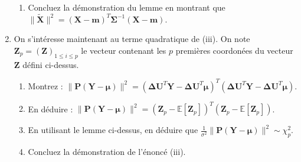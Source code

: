 \documentclass{../headers/td_upc}
\providecommand{\1}{\mathds{1}}
\begin{document}
\begin{enumerate}
\begin{enumerate}
		\item Concluez la démonstration du lemme en montrant que 
		$\|\tilde{\mathbf{X}}\|^2 = (\mathbf{X} - \mathbf{m})^T \mathbf{\Sigma}^{-1}(\mathbf{X} - \mathbf{m})$.
		\end{enumerate}
		\item On s'intéresse maintenant au terme quadratique de (iii).
		On note $\mathbf{Z}_p = (\mathbf{Z})_{1 \leq i \leq p}$ le vecteur contenant
		les $p$ premières coordonées du vecteur $\mathbf{Z}$ défini ci-dessus.
		\begin{enumerate}
		\item Montrez :
		$
		\|\mathbf{P}(\mathbf{Y} - \boldsymbol{\mu}) \|^2 = 
		(\mathbf{\Delta}\mathbf{U}^T\mathbf{Y} - \mathbf{\Delta}\mathbf{U}^T\boldsymbol{\mu})^T
		(\mathbf{\Delta}\mathbf{U}^T\mathbf{Y} - \mathbf{\Delta}\mathbf{U}^T\boldsymbol{\mu})
		$.
		\item 
		En déduire :
		$
		\|\mathbf{P}(\mathbf{Y} - \boldsymbol{\mu}) \|^2 = 
		(\mathbf{Z}_p - \mathbb{E}[\mathbf{Z}_p])^T(\mathbf{Z}_p - \mathbb{E}[\mathbf{Z}_p])
		$.
		\item En utilisant le lemme ci-dessus, en déduire que 
		$\frac{1}{\sigma^2}\|\mathbf{P}(\mathbf{Y} - \boldsymbol{\mu}) \|^2 \sim \chi^2_{p}$.
		\item Concluez la démonstration de l'énoncé (iii).
		\end{enumerate}
	\end{enumerate}
\end{document}

